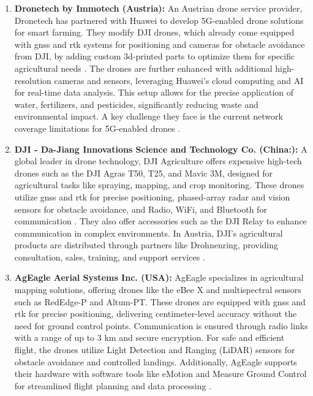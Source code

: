 \begin{enumerate} 
	\item \textbf{Dronetech by Immotech (Austria):} An Austrian drone service provider, Dronetech has partnered with Huawei to develop 5G-enabled drone solutions for smart farming. They modify DJI drones, which already come equipped with \acrfull{gnss} and \acrfull{rtk} systems for positioning and cameras for obstacle avoidance from DJI, by adding custom \acrfull{3d}-printed parts to optimize them for specific agricultural needs \cite{dronetech_instagram, dji_m300}. The drones are further enhanced with additional high-resolution cameras and sensors, leveraging Huawei's cloud computing and AI for real-time data analysis. This setup allows for the precise application of water, fertilizers, and pesticides, significantly reducing waste and environmental impact. A key challenge they face is the current network coverage limitations for 5G-enabled drones \cite{huawei_dronetech_2022, huawei_boosting_farming_2022, dronetech_smart_farming_project}.

	\item \textbf{DJI - Da-Jiang Innovations Science and Technology Co. (China:):} A global leader in drone technology, DJI Agriculture offers expensive high-tech drones such as the DJI Agras T50, T25, and Mavic 3M, designed for agricultural tasks like spraying, mapping, and crop monitoring. These drones utilize \acrshort{gnss} and \acrshort{rtk} for precise positioning, phased-array radar and vision sensors for obstacle avoidance, and Radio, WiFi, and Bluetooth for communication \cite{dji_ag_t25, dji_ag_t50}. They also offer accessories such as the DJI Relay to enhance communication in complex environments. In Austria, DJI's agricultural products are distributed through partners like Drohnenring, providing consultation, sales, training, and support services \cite{drohnenring_2024, dji_agriculture_2024}.
	
	\item \textbf{AgEagle Aerial Systems Inc. (USA):} AgEagle specializes in agricultural mapping solutions, offering drones like the eBee X and multispectral sensors such as RedEdge-P and Altum-PT. These drones are equipped with \acrshort{gnss} and \acrshort{rtk} for precise positioning, delivering centimeter-level accuracy without the need for ground control points. Communication is ensured through radio links with a range of up to 3 km and secure encryption. For safe and efficient flight, the drones utilize Light Detection and Ranging (LiDAR) sensors for obstacle avoidance and controlled landings. Additionally, AgEagle supports their hardware with software tools like eMotion and Measure Ground Control for streamlined flight planning and data processing \cite{ageagle_agriculture_2024, ageagle_agriculture_ebee}.
\end{enumerate}

